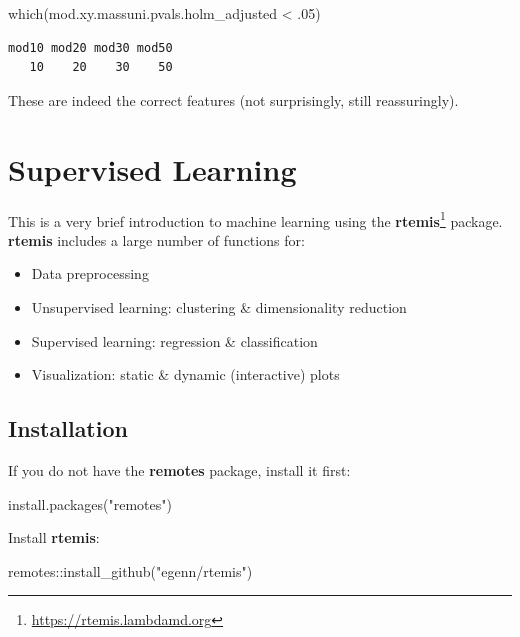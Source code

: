 \documentclass[
]{book}
\newenvironment{Shaded}{\begin{snugshade}}{\end{snugshade}}
\newcommand{\DecValTok}[1]{\textcolor[rgb]{0.00,0.00,0.81}{#1}}
\newcommand{\FunctionTok}[1]{\textcolor[rgb]{0.00,0.00,0.00}{#1}}
\newcommand{\NormalTok}[1]{#1}
\newcommand{\SpecialCharTok}[1]{\textcolor[rgb]{0.00,0.00,0.00}{#1}}
\newcommand{\StringTok}[1]{\textcolor[rgb]{0.31,0.60,0.02}{#1}}
\DeclareRobustCommand{\href}[2]{#2\footnote{\url{#1}}}
\providecommand{\tightlist}{%
  \setlength{\itemsep}{0pt}\setlength{\parskip}{0pt}}
\renewcommand{\href}[2]{#2\footnote{\url{#1}}}
\begin{document}
\begin{Shaded}
\begin{Highlighting}[]
\FunctionTok{which}\NormalTok{(mod.xy.massuni.pvals.holm\_adjusted }\SpecialCharTok{\textless{}}\NormalTok{ .}\DecValTok{05}\NormalTok{)}
\end{Highlighting}
\end{Shaded}

\begin{verbatim}
mod10 mod20 mod30 mod50 
   10    20    30    50 
\end{verbatim}

These are indeed the correct features (not surprisingly, still reassuringly).

\hypertarget{supervised}{%
\chapter{Supervised Learning}\label{supervised}}

This is a very brief introduction to machine learning using the \href{https://rtemis.lambdamd.org}{\textbf{rtemis}} package. \textbf{rtemis} includes a large number of functions for:

\begin{itemize}
\tightlist
\item
  Data preprocessing
\item
  Unsupervised learning: clustering \& dimensionality reduction
\item
  Supervised learning: regression \& classification
\item
  Visualization: static \& dynamic (interactive) plots
\end{itemize}

\hypertarget{installation}{%
\section{Installation}\label{installation}}

If you do not have the \textbf{remotes} package, install it first:

\begin{Shaded}
\begin{Highlighting}[]
\FunctionTok{install.packages}\NormalTok{(}\StringTok{"remotes"}\NormalTok{)}
\end{Highlighting}
\end{Shaded}

Install \textbf{rtemis}:

\begin{Shaded}
\begin{Highlighting}[]
\NormalTok{remotes}\SpecialCharTok{::}\FunctionTok{install\_github}\NormalTok{(}\StringTok{"egenn/rtemis"}\NormalTok{)}
\end{Highlighting}
\end{Shaded}
\end{document}
